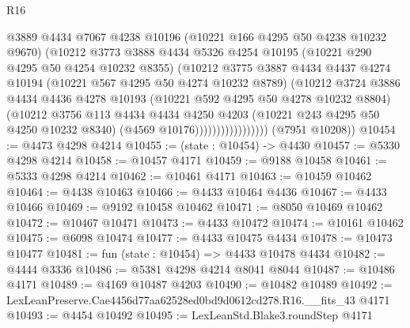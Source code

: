 \begin{lexlean}{R16}
\begin{coremodule}
                              @3889
                              @4434
                              @7067
                              @4238
                              @10196
                              (@10221 @166 @4295 @50 @4238 @10232 @9670)
                              (@10212
                                @3773
                                @3888
                                @4434
                                @5326
                                @4254
                                @10195
                                (@10221 @290 @4295 @50 @4254 @10232 @8355)
                                (@10212
                                  @3775
                                  @3887
                                  @4434
                                  @4437
                                  @4274
                                  @10194
                                  (@10221 @567 @4295 @50 @4274 @10232 @8789)
                                  (@10212
                                    @3724
                                    @3886
                                    @4434
                                    @4436
                                    @4278
                                    @10193
                                    (@10221 @592 @4295 @50 @4278 @10232 @8804)
                                    (@10212
                                      @3756
                                      @113
                                      @4434
                                      @4434
                                      @4250
                                      @4203
                                      (@10221 @243 @4295 @50 @4250 @10232 @8340)
                                      (@4569 @10176)))))))))))))))))
      (@7951 @10208))
@10454 := @4473 @4298 @4214
@10455 := (state : @10454) -> @4430
@10457 := @5330 @4298 @4214
@10458 := @10457 @4171
@10459 := @9188 @10458
@10461 := @5333 @4298 @4214
@10462 := @10461 @4171
@10463 := @10459 @10462
@10464 := @4438 @10463
@10466 := @4433 @10464 @4436
@10467 := @4433 @10466
@10469 := @9192 @10458 @10462
@10471 := @8050 @10469 @10462
@10472 := @10467 @10471
@10473 := @4433 @10472
@10474 := @10161 @10462
@10475 := @6098 @10474
@10477 := @4433 @10475 @4434
@10478 := @10473 @10477
@10481 := fun (state : @10454) => @4433 @10478 @4434
@10482 := @4444 @3336
@10486 := @5381 @4298 @4214 @8041 @8044
@10487 := @10486 @4171
@10489 := @4169 @10487 @4203
@10490 := @10482 @10489
@10492 := LexLeanPreserve.Cae4456d77aa62528ed0bd9d0612cd278.R16.__fits_43 @4171
@10493 := @4454 @10492
@10495 := LexLeanStd.Blake3.roundStep @4171

\end{coremodule}
\end{lexlean}
